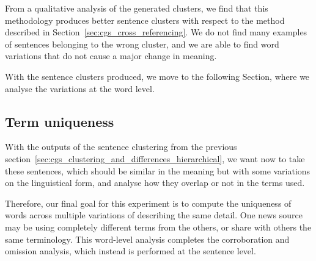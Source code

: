 

From a qualitative analysis of the generated clusters, we find that this methodology produces better sentence clusters with respect to the method described in Section~\ref{sec:cgs_cross_referencing}.
We do not find many examples of sentences belonging to the wrong cluster, and we are able to find word variations that do not cause a major change in meaning.

With the sentence clusters produced, we move to the following Section, where we analyse the variations at the word level.

\subsection{\statusgreen Term uniqueness}
\label{sec:cgs_clustering_and_differences_uniqueness}

With the outputs of the sentence clustering from the previous section~\ref{sec:cgs_clustering_and_differences_hierarchical}, we want now to take these sentences, which should be similar in the meaning but with some variations on the linguistical form, and analyse how they overlap or not in the terms used.

Therefore, our final goal for this experiment is to compute the uniqueness of words across multiple variations of describing the same detail.
One news source may be using completely different terms from the others, or share with others the same terminology.
This word-level analysis completes the corroboration and omission analysis, which instead is performed at the sentence level.

